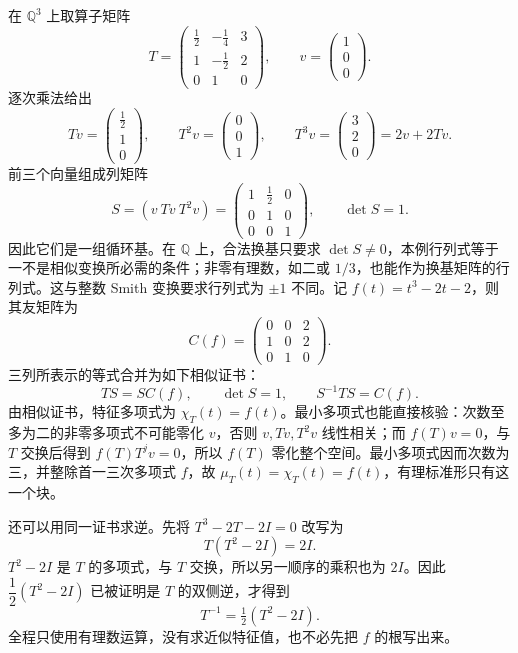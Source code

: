 在 \(\mathbb Q^3\) 上取算子矩阵
\[
	T=\begin{pmatrix}
		\tfrac12&-\tfrac14&3\\
		1&-\tfrac12&2\\
		0&1&0
	\end{pmatrix},\qquad v=\begin{pmatrix}1\\0\\0\end{pmatrix}.
\]
逐次乘法给出
\[
	Tv=\begin{pmatrix}\tfrac12\\1\\0\end{pmatrix},\qquad
	T^2v=\begin{pmatrix}0\\0\\1\end{pmatrix},\qquad
	T^3v=\begin{pmatrix}3\\2\\0\end{pmatrix}=2v+2Tv.
\]
前三个向量组成列矩阵
\[
	S=(v\ Tv\ T^2v)=
	\begin{pmatrix}1&\tfrac12&0\\0&1&0\\0&0&1\end{pmatrix},\qquad \det S=1.
\]
因此它们是一组循环基。在 \(\mathbb Q\) 上，合法换基只要求 \(\det S\ne0\)，本例行列式等于一不是相似变换所必需的条件；非零有理数，如二或 \(1/3\)，也能作为换基矩阵的行列式。这与整数 Smith 变换要求行列式为 \(\pm1\) 不同。记 \(f(t)=t^3-2t-2\)，则其友矩阵为
\[
	C(f)=\begin{pmatrix}0&0&2\\1&0&2\\0&1&0\end{pmatrix}.
\]
三列所表示的等式合并为如下相似证书：
\begin{equation}\label{b2:eq:A-rational-similarity}
	TS=SC(f),\qquad \det S=1, \qquad S^{-1}TS=C(f).
\end{equation}
由相似证书，特征多项式为 \(\chi_T(t)=f(t)\)。最小多项式也能直接核验：次数至多为二的非零多项式不可能零化 \(v\)，否则 \(v,Tv,T^2v\) 线性相关；而 \(f(T)v=0\)，与 \(T\) 交换后得到 \(f(T)T^jv=0\)，所以 \(f(T)\) 零化整个空间。最小多项式因而次数为三，并整除首一三次多项式 \(f\)，故 \(\mu_T(t)=\chi_T(t)=f(t)\)，有理标准形只有这一个块。

\ProseParagraphBreak
还可以用同一证书求逆。先将 \(T^3-2T-2I=0\) 改写为
\[
	T(T^2-2I)=2I.
\]
\(T^2-2I\) 是 \(T\) 的多项式，与 \(T\) 交换，所以另一顺序的乘积也为 \(2I\)。因此 \(\dfrac12(T^2-2I)\) 已被证明是 \(T\) 的双侧逆，才得到
\begin{equation}\label{b2:eq:A-rational-inverse}
	T^{-1}=\tfrac12(T^2-2I).
\end{equation}
全程只使用有理数运算，没有求近似特征值，也不必先把 \(f\) 的根写出来。

